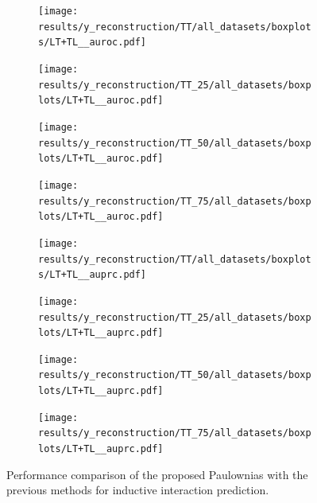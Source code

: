 \documentclass{article}
\begin{document}
\begin{figure}
    \centering
    \begin{subfigure}{.24\textwidth}
        \texttt{[image: results/y\_reconstruction/TT/all\_datasets/boxplots/LT+TL\_\_auroc.pdf]}
    \end{subfigure}
    \begin{subfigure}{.24\textwidth}
        \texttt{[image: results/y\_reconstruction/TT\_25/all\_datasets/boxplots/LT+TL\_\_auroc.pdf]}
    \end{subfigure}
    \begin{subfigure}{.24\textwidth}
        \texttt{[image: results/y\_reconstruction/TT\_50/all\_datasets/boxplots/LT+TL\_\_auroc.pdf]}
    \end{subfigure}
    \begin{subfigure}{.24\textwidth}
        \texttt{[image: results/y\_reconstruction/TT\_75/all\_datasets/boxplots/LT+TL\_\_auroc.pdf]}
    \end{subfigure}

     \begin{subfigure}{.24\textwidth}
        \texttt{[image: results/y\_reconstruction/TT/all\_datasets/boxplots/LT+TL\_\_auprc.pdf]}
    \end{subfigure}
    \begin{subfigure}{.24\textwidth}
        \texttt{[image: results/y\_reconstruction/TT\_25/all\_datasets/boxplots/LT+TL\_\_auprc.pdf]}
    \end{subfigure}
    \begin{subfigure}{.24\textwidth}
        \texttt{[image: results/y\_reconstruction/TT\_50/all\_datasets/boxplots/LT+TL\_\_auprc.pdf]}
    \end{subfigure}
    \begin{subfigure}{.24\textwidth}
        \texttt{[image: results/y\_reconstruction/TT\_75/all\_datasets/boxplots/LT+TL\_\_auprc.pdf]}
    \end{subfigure}   
    \caption{Performance comparison of the proposed Paulownias with the previous methods for inductive interaction prediction.}
    \label{fig:ss_LTTL}
\end{figure}



\end{document}
